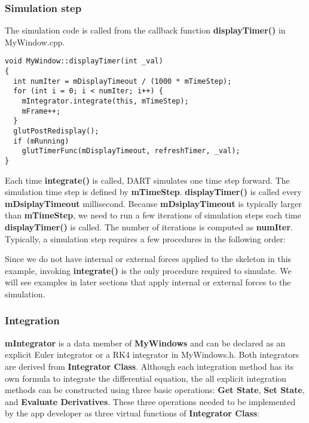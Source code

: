 \subsubsection{Simulation step}
The simulation code is called from the callback function
\textbf{displayTimer()} in MyWindow.cpp.

\ttfamily
\begin{lstlisting}[caption=MyWindows.cpp]
void MyWindow::displayTimer(int _val)
{
  int numIter = mDisplayTimeout / (1000 * mTimeStep);
  for (int i = 0; i < numIter; i++) {
    mIntegrator.integrate(this, mTimeStep);
    mFrame++;
  }
  glutPostRedisplay();
  if (mRunning)	
    glutTimerFunc(mDisplayTimeout, refreshTimer, _val);
}
\end{lstlisting}
\rmfamily Each time \textbf{integrate()} is called, DART simulates one
time step forward. The simulation time step is defined by
\textbf{mTimeStep}. \textbf{displayTimer()} is called every
\textbf{mDsiplayTimeout} millisecond. Because \textbf{mDsiplayTimeout}
is typically larger than \textbf{mTimeStep}, we need to run a few
iterations of simulation steps each time \textbf{displayTimer()} is
called. The number of iterations is computed as
\textbf{numIter}. Typically, a simulation step requires a few
procedures in the following order:


Since we do not have internal or external forces applied to the
skeleton in this example, invoking \textbf{integrate()} is the only
procedure required to simulate. We will see examples in later sections
that apply internal or external forces to the simulation.

\subsubsection{Integration}
\textbf{mIntegrator} is a data member of \textbf{MyWindows} and can be
declared as an explicit Euler integrator or a RK4 integrator in
MyWindows.h. Both integrators are derived from \textbf{Integrator
  Class}. Although each integration method has its own formula to
integrate the differential equation, the all explicit integration
methods can be constructed using three basic operations: \textbf{Get
  State}, \textbf{Set State}, and \textbf{Evaluate Derivatives}. These
three operations needed to be implemented by the app developer as
three virtual functions of \textbf{Integrator Class}:

